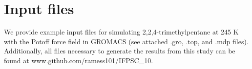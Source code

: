 \documentclass[preprint,review,11pt]{elsarticle}
\begin{document}
\begin{frontmatter}
%			
%			
%			
%			
%		
%			
%			
%			
%			
		
	\end{frontmatter}	
	
	
	\section{Input files} \label{Gromacs input files}
	
	We provide example input files for simulating 2,2,4-trimethylpentane at 245 K with the Potoff force field in GROMACS (see attached .gro, .top, and .mdp files). Additionally, all files necessary to generate the results from this study can be found at \newline www.github.com/ramess101/IFPSC\_10.
	
	
\end{document}
